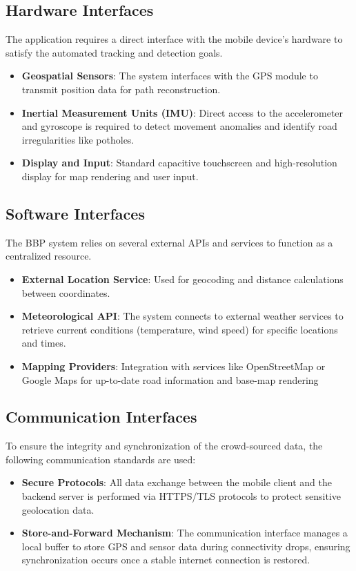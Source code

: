 \subsection{Hardware Interfaces}
The application requires a direct interface with the mobile device's hardware to satisfy the automated tracking and detection goals.
\begin{itemize}
    \item \textbf{Geospatial Sensors}: The system interfaces with the GPS module to transmit position data for path reconstruction.
    \item \textbf{Inertial Measurement Units (IMU)}: Direct access to the accelerometer and gyroscope is required to detect movement anomalies and identify road irregularities like potholes.
    \item \textbf{Display and Input}: Standard capacitive touchscreen and high-resolution display for map rendering and user input.
\end{itemize}
\subsection{Software Interfaces}
The BBP system relies on several external APIs and services to function as a centralized resource.
\begin{itemize}
    \item \textbf{External Location Service}: Used for geocoding and distance calculations between coordinates.
    \item \textbf{Meteorological API}: The system connects to external weather services to retrieve current conditions (temperature, wind speed) for specific locations and times.
    \item \textbf{Mapping Providers}: Integration with services like OpenStreetMap or Google Maps for up-to-date road information and base-map rendering
\end{itemize}
\subsection{Communication Interfaces}
To ensure the integrity and synchronization of the crowd-sourced data, the following communication standards are used:
\begin{itemize}
    \item \textbf{Secure Protocols}: All data exchange between the mobile client and the backend server is performed via HTTPS/TLS protocols to protect sensitive geolocation data.
    \item \textbf{Store-and-Forward Mechanism}: The communication interface manages a local buffer to store GPS and sensor data during connectivity drops, ensuring synchronization occurs once a stable internet connection is restored.
\end{itemize}
